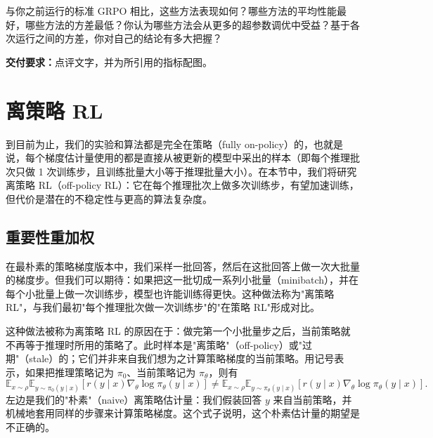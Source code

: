 与你之前运行的标准 GRPO 相比，这些方法表现如何？哪些方法的平均性能最好，哪些方法的方差最低？你认为哪些方法会从更多的超参数调优中受益？基于各次运行之间的方差，你对自己的结论有多大把握？

\textbf{交付要求：}点评文字，并为所引用的指标配图。

\section{离策略 RL}

到目前为止，我们的实验和算法都是完全在策略（fully on-policy）的，也就是说，每个梯度估计量使用的都是直接从被更新的模型中采出的样本（即每个推理批次只做 1 次训练步，且训练批量大小等于推理批量大小）。在本节中，我们将研究离策略 RL（off-policy RL）：它在每个推理批次上做多次训练步，有望加速训练，但代价是潜在的不稳定性与更高的算法复杂度。

\subsection{重要性重加权}

在最朴素的策略梯度版本中，我们采样一批回答，然后在这批回答上做一次大批量的梯度步。但我们可以期待：如果把这一批切成一系列小批量（minibatch），并在每个小批量上做一次训练步，模型也许能训练得更快。这种做法称为"离策略 RL"，与我们最初"每个推理批次做一次训练步"的"在策略 RL"形成对比。

这种做法被称为离策略 RL 的原因在于：做完第一个小批量步之后，当前策略就不再等于推理时所用的策略了。此时样本是"离策略"（off-policy）或"过期"（stale）的；它们并非来自我们想为之计算策略梯度的当前策略。用记号表示，如果把推理策略记为 $\pi_0$、当前策略记为 $\pi_\theta$，则有
\begin{equation}
\mathbb{E}_{x\sim\rho}\mathbb{E}_{y\sim\pi_0(y \mid x)}\!\left[r(y \mid x)\nabla_\theta \log \pi_\theta(y \mid x)\right] \neq \mathbb{E}_{x\sim\rho}\mathbb{E}_{y\sim\pi_\theta(y \mid x)}\!\left[r(y \mid x)\nabla_\theta \log \pi_\theta(y \mid x)\right].
\end{equation}
左边是我们的"朴素"（naive）离策略估计量：我们假装回答 $y$ 来自当前策略，并机械地套用同样的步骤来计算策略梯度。这个式子说明，这个朴素估计量的期望是不正确的。

